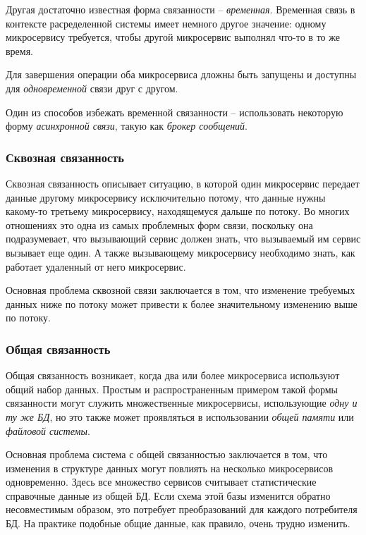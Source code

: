 \documentclass[%
	11pt,
	a4paper,
	utf8,
		]{article}
\begin{document}
Другая достаточно известная форма связанности -- \emph{временная}. Временная связь в контексте расределенной системы имеет немного другое значение: одному микросервису требуется, чтобы другой микросервис выполнял что-то в то же время.

Для завершения операции оба микросервиса дложны быть запущены и доступны для \emph{одновременной} связи друг с другом. 

Один из способов избежать временной связанности -- использовать некоторую форму \emph{асинхронной связи}, такую как \emph{брокер сообщений}.

\subsubsection{Сквозная связанность}

Сквозная связанность описывает ситуацию, в которой один микросервис передает данные другому микросервису исключительно потому, что данные нужны какому-то третьему микросервису, находящемуся дальше по потоку. Во многих отношениях это одна из самых проблемных форм связи, поскольку она подразумевает, что вызывающий сервис должен знать, что вызываемый им сервис вызывает еще один. А также вызывающему микросервису необходимо знать, как работает удаленный от него микросервис.

Основная проблема сквозной связи заключается в том, что изменение требуемых данных ниже по потоку может привести к более значительному изменению выше по потоку.


\subsubsection{Общая связанность}

Общая связанность возникает, когда два или более микросервиса используют общий набор данных. Простым и распространенным примером такой формы связанности могут служить множественные микросервисы, использующие \emph{одну и ту же БД}, но это также может проявляться в использовании \emph{общей памяти} или \emph{файловой системы}.

Основная проблема система с общей связанностью заключается в том, что изменения в структуре данных могут повлиять на несколько микросервисов одновременно. Здесь все множество сервисов считывает статистические справочные данные из общей БД. Если схема этой базы изменится обратно несовместимым образом, это потребует преобразований для каждого потребителя БД. На практике подобные общие данные, как правило, очень трудно изменить.
\end{document}
